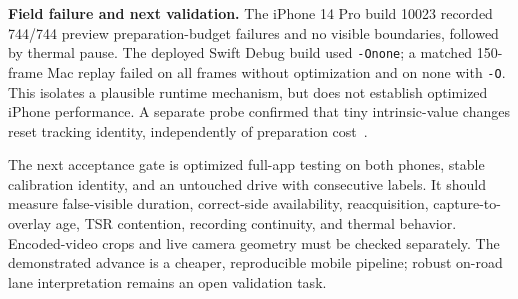 \documentclass[11pt,a4paper]{article}
\newcommand{\code}[1]{\texttt{\small #1}}
\begin{document}
\textbf{Field failure and next validation.}
The iPhone 14 Pro build 10023 recorded 744/744 preview preparation-budget failures
and no visible boundaries, followed by thermal pause. The deployed Swift Debug
build used \code{-Onone}; a matched 150-frame Mac replay failed on all frames
without optimization and on none with \code{-O}. This isolates a plausible runtime
mechanism, but does not establish optimized iPhone performance. A separate probe
confirmed that tiny intrinsic-value changes reset tracking identity, independently
of preparation cost~\cite{failure}.

The next acceptance gate is optimized full-app testing on both phones, stable
calibration identity, and an untouched drive with consecutive labels. It should
measure false-visible duration, correct-side availability, reacquisition,
capture-to-overlay age, TSR contention, recording continuity, and thermal behavior.
Encoded-video crops and live camera geometry must be checked separately.
The demonstrated advance is a cheaper, reproducible mobile pipeline; robust
on-road lane interpretation remains an open validation task.
\end{document}
